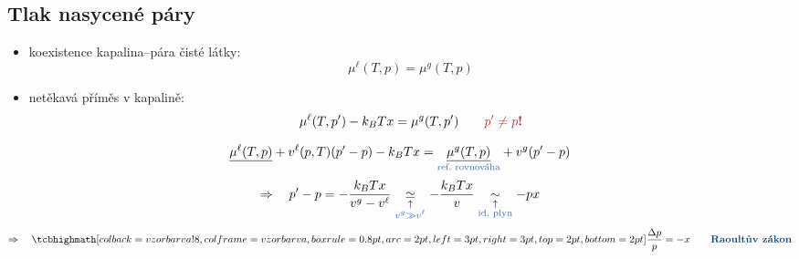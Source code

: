 \subsection*{Tlak nasycené páry}
\begin{itemize}
  \item koexistence kapalina--pára čisté látky:
  \[ \mu^\ell(T,p) = \mu^g(T,p) \]
  \item netěkavá příměs v kapalině:
  \[
    \mu^\ell(T,p') - k_BTx = \mu^g(T,p') \qquad \text{\pozor{$p'\neq p$!}}
  \]
\end{itemize}
\[
  \underline{\mu^\ell(T,p)} + v^\ell(p,T)(p' - p) - k_BTx
  = \underset{\textcolor{NavyBlue}{\text{ref.\ rovnováha}}}{\underline{\mu^g(T,p)}} + v^g(p' - p)
\]
\[
  \Rightarrow\quad p' - p = -\frac{k_BTx}{v^g - v^\ell}
  \underset{\substack{\uparrow\\ \textcolor{NavyBlue}{v^g\gg v^\ell}}}{\simeq} -\frac{k_BTx}{v}
  \underset{\substack{\uparrow\\ \textcolor{NavyBlue}{\text{id.\ plyn}}}}{\sim} -px
\]
\[
  \Rightarrow\quad \vzorec{\frac{\Delta p}{p} = -x} \qquad \text{\kw{Raoultův zákon}}
\]

